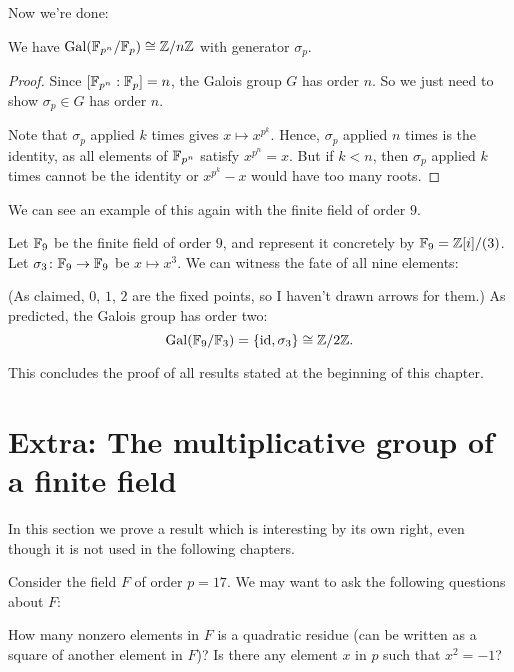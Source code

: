 Now we're done:
\begin{theorem}
	We have $\operatorname{Gal}(\mathbb F_{p^n}/\mathbb F_p) \cong \mathbb Z/n\mathbb Z$ with generator $\sigma_p$.
\end{theorem}
\begin{proof}
	Since $[\mathbb F_{p^n}:\mathbb F_p] = n$, the Galois group $G$ has order $n$.
	So we just need to show $\sigma_p \in G$ has order $n$.

	Note that $\sigma_p$ applied $k$ times gives $x \mapsto x^{p^k}$.
	Hence, $\sigma_p$ applied $n$ times is the identity,
	as all elements of $\mathbb F_{p^n}$ satisfy $x^{p^n}=x$.
	But if $k < n$, then $\sigma_p$ applied $k$ times
	cannot be the identity or $x^{p^k}-x$ would have too many roots.
\end{proof}

We can see an example of this again with the finite field of order $9$.
\begin{example}
	Let $\mathbb F_9$ be the finite field of order $9$,
	and represent it concretely by $\mathbb F_9 = \mathbb Z[i]/(3)$.
	Let $\sigma_3 \colon \mathbb F_9 \to \mathbb F_9$ be $x \mapsto x^3$.
	We can witness the fate of all nine elements:
	\begin{center}
	\end{center}
	(As claimed, $0$, $1$, $2$ are the fixed points,
	so I haven't drawn arrows for them.)
	As predicted, the Galois group has order two:
	\[ \operatorname{Gal}(\mathbb F_9/\mathbb F_3) = \left\{ \mathrm{id}, \sigma_3 \right\} \cong \mathbb Z/2\mathbb Z. \]
\end{example}

This concludes the proof of all results stated at the beginning of this chapter.

\section{Extra: The multiplicative group of a finite field}

In this section we prove a result which is interesting by its own right, even though it is not used
in the following chapters.

Consider the field $F$ of order $p = 17$. We may want to ask the following questions about $F$:
\begin{itemize}
	\ii How many nonzero elements in $F$ is a quadratic residue (can be written as a square of
	another element in $F$)?
	\ii Is there any element $x$ in $p$ such that $x^2 = -1$?
\end{itemize}

